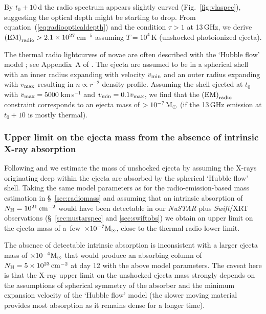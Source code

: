 \documentclass[a4paper,fleqn,usenatbib]{mnras}
\begin{document}
By $t_0+10$\,d the radio spectrum appears slightly curved
(Fig.~\ref{fig:vlaspec}), suggesting the optical depth might be starting to drop.
From equation~(\ref{eq:radioopticaldepth}) and the condition $\tau > 1$ at 13\,GHz, we derive 
${\rm (EM)}_{\rm radio} > 2.1 \times 10^{27}$\,cm$^{-5}$ assuming $T=10^4$\,K
(unshocked photoionized ejecta).

The thermal radio lightcurves of novae are often described with the `Hubble flow' model
\citep{1979AJ.....84.1619H,1996ASPC...93..174H,2005MNRAS.362..469H}; see  Appendix~A
of \cite{2018ApJ...852..108F}. The ejecta are assumed to be in a spherical shell with 
an inner radius expanding with velocity $v_{\rm min}$ and an outer radius expanding with $v_{\rm max}$
resulting in $n \propto r^{-2}$ density profile. 
Assuming the shell ejected at $t_0$ with $v_{\rm max} = 5000$\,km\,s$^{-1}$ 
\citep[the maximum velocity reported by][]{2021ATel14710....1A} and 
$v_{\rm min} = 0.1 v_{\rm max}$, we find that the ${\rm (EM)}_{\rm radio}$
constraint corresponds to an ejecta mass of $>10^{-7}\, {\rm M}_\odot$
(if the 13\,GHz emission at $t_0+10$ is mostly thermal). 

\subsubsection{Upper limit on the ejecta mass from the absence of intrinsic X-ray absorption}
\label{sec:noxrayabsmass}

Following \cite{2020MNRAS.497.2569S} and \cite{2021MNRAS.500.2798N} we
estimate the mass of unshocked ejecta by assuming the X-rays originating deep 
within the ejecta are absorbed by the spherical `Hubble flow' shell. 
Taking the same model parameters as for the radio-emission-based mass
estimation in \S~\ref{sec:radiomass} and assuming that an intrinsic
absorption of $N_\mathrm{H} = 10^{21}\,{\rm cm}^{-2}$ would have been
detectable in our {\em NuSTAR} plus {\em Swift}/XRT observations 
(\S~\ref{sec:nustarspec} and \ref{sec:swiftobs}) we obtain an upper limit on
the ejecta mass of a~few~$\times 10^{-7} {\rm M}_\odot$, close to 
the thermal radio lower limit. 

The absence of detectable intrinsic absorption is inconsistent with
a larger ejecta mass of $\times 10^{-4} {\rm M}_\odot$ that would
produce an absorbing column of $N_\mathrm{H} = 5 \times 10^{23}\,{\rm cm}^{-2}$
at day 12 with the above model parameters. 
The caveat here is that the X-ray upper limit on the unshocked ejecta mass 
strongly depends on the assumptions of spherical symmetry of the absorber and 
the minimum expansion velocity of the `Hubble flow' model (the slower moving
material provides most absorption as it remains dense for a longer time).
\end{document}
